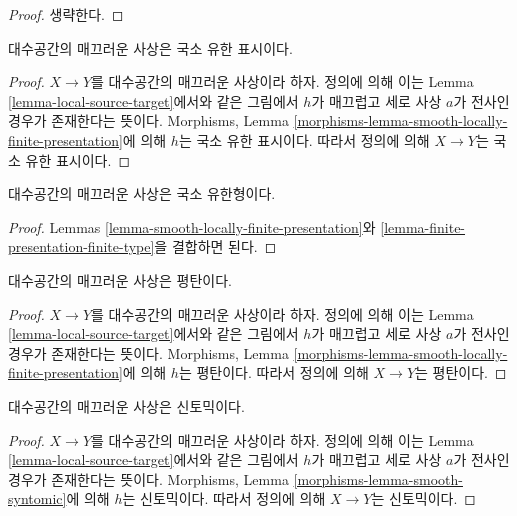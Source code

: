 \begin{proof}
생략한다.
\end{proof}

\begin{lemma}
\label{lemma-smooth-locally-finite-presentation}
대수공간의 매끄러운 사상은 국소 유한 표시이다.
\end{lemma}

\begin{proof}
$X \to Y$를 대수공간의 매끄러운 사상이라 하자. 정의에 의해 이는
Lemma \ref{lemma-local-source-target}에서와 같은 그림에서 $h$가
매끄럽고 세로 사상 $a$가 전사인 경우가 존재한다는 뜻이다.
Morphisms, Lemma
\ref{morphisms-lemma-smooth-locally-finite-presentation}에 의해
$h$는 국소 유한 표시이다. 따라서 정의에 의해 $X \to Y$는 국소
유한 표시이다.
\end{proof}

\begin{lemma}
\label{lemma-smooth-locally-finite-type}
대수공간의 매끄러운 사상은 국소 유한형이다.
\end{lemma}

\begin{proof}
Lemmas \ref{lemma-smooth-locally-finite-presentation}와
\ref{lemma-finite-presentation-finite-type}을 결합하면 된다.
\end{proof}

\begin{lemma}
\label{lemma-smooth-flat}
대수공간의 매끄러운 사상은 평탄이다.
\end{lemma}

\begin{proof}
$X \to Y$를 대수공간의 매끄러운 사상이라 하자. 정의에 의해 이는
Lemma \ref{lemma-local-source-target}에서와 같은 그림에서 $h$가
매끄럽고 세로 사상 $a$가 전사인 경우가 존재한다는 뜻이다.
Morphisms, Lemma \ref{morphisms-lemma-smooth-locally-finite-presentation}에
의해 $h$는 평탄이다. 따라서 정의에 의해 $X \to Y$는 평탄이다.
\end{proof}

\begin{lemma}
\label{lemma-smooth-syntomic}
대수공간의 매끄러운 사상은 신토믹이다.
\end{lemma}

\begin{proof}
$X \to Y$를 대수공간의 매끄러운 사상이라 하자. 정의에 의해 이는
Lemma \ref{lemma-local-source-target}에서와 같은 그림에서 $h$가
매끄럽고 세로 사상 $a$가 전사인 경우가 존재한다는 뜻이다.
Morphisms, Lemma \ref{morphisms-lemma-smooth-syntomic}에 의해
$h$는 신토믹이다. 따라서 정의에 의해 $X \to Y$는 신토믹이다.
\end{proof}

